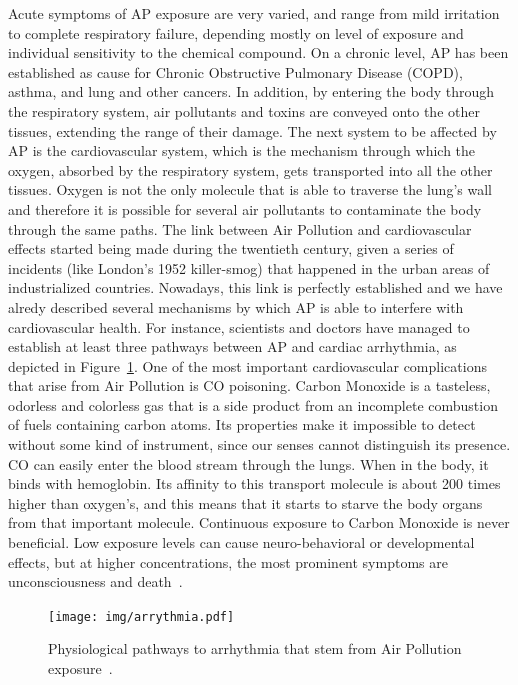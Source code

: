 Acute symptoms of \gls{AP} exposure are very varied, and range from mild
irritation to complete respiratory failure, depending mostly on level of
exposure and individual sensitivity to the chemical compound. On a
chronic level, \gls{AP} has been established as cause for Chronic
Obstructive Pulmonary Disease (\gls{COPD}), asthma, and lung and other
cancers. In addition, by entering the body through the respiratory
system, air pollutants and toxins are conveyed onto the other tissues,
extending the range of their damage. The next system to be affected by
\gls{AP} is the cardiovascular system, which is the mechanism through
which the oxygen, absorbed by the respiratory system, gets transported
into all the other tissues. Oxygen is not the only molecule
that is able to traverse the lung's wall and therefore it is possible
for several air pollutants to contaminate the body through the same
paths. The link between Air Pollution and cardiovascular effects started
being made during the twentieth century, given a series of incidents
(like London's 1952 killer-smog) that happened in the urban areas of
industrialized countries. Nowadays, this link is perfectly established
and we have alredy described several mechanisms by which \gls{AP} is
able to interfere with cardiovascular health. For instance, scientists
and doctors have managed to establish at least three pathways between
\gls{AP} and cardiac arrhythmia, as depicted in
Figure~\ref{fig:arrhythmia}. One of the most important cardiovascular
complications that arise from Air Pollution is CO poisoning. Carbon
Monoxide is a tasteless, odorless and colorless gas that is a side
product from an incomplete combustion of fuels containing carbon atoms.
Its properties make it impossible to detect without some kind of
instrument, since our senses cannot distinguish its presence. CO can
easily enter the blood stream through the lungs. When in the body, it
binds with hemoglobin. Its affinity to this transport molecule is about
200 times higher than oxygen's, and this means that it starts to starve
the body organs from that important molecule. Continuous exposure to
Carbon Monoxide is never beneficial. Low exposure levels can cause
neuro-behavioral or developmental effects, but at higher concentrations,
the most prominent symptoms are unconsciousness and
death~\cite{Penney}.

\begin{figure}[htpb]
    \centering
    \texttt{[image: img/arrythmia.pdf]}
    \caption{Physiological pathways to arrhythmia that stem from Air
    Pollution exposure~\cite{Vallero2014}.}
    \label{fig:arrhythmia}
\end{figure}

